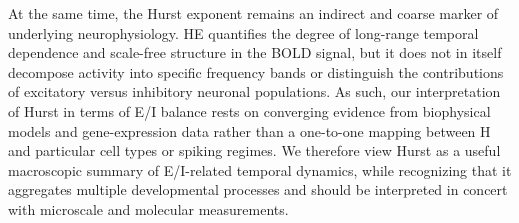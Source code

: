
At the same time, the Hurst exponent remains an indirect and coarse marker of underlying neurophysiology. HE quantifies the degree of long-range temporal dependence and scale-free structure in the BOLD signal\cite{gaoInferringSynapticExcitation2017}, but it does not in itself decompose activity into specific frequency bands or distinguish the contributions of excitatory versus inhibitory neuronal populations\cite{carterlenoInfantExcitationInhibition2022,stanyardAperiodicHurstEEG2024a}. As such, our interpretation of Hurst in terms of E/I balance rests on converging evidence from biophysical models and gene-expression data rather than a one-to-one mapping between H and particular cell types or spiking regimes\cite{trakoshisIntrinsicExcitationinhibitionImbalance2020,nishioHurstExponentMarker2024}. We therefore view Hurst as a useful macroscopic summary of E/I-related temporal dynamics, while recognizing that it aggregates multiple developmental processes and should be interpreted in concert with microscale and molecular measurements.

